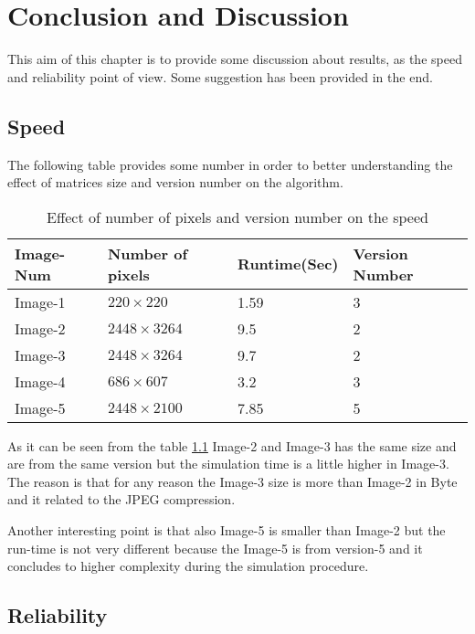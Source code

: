 \chapter{Conclusion and Discussion}

This aim of this chapter is to provide some discussion about results, as the speed and reliability point of view. Some suggestion has been provided in the end.

\section{Speed}

The following table provides some number in order to better understanding the effect of matrices size and version number on the algorithm.

\begin{table}[h!]
  \centering
          \caption{Effect of number of pixels and version number on the speed}
         \label{table5.1}
    \begin{tabular}{| l | l | l | l |}
    \hline
    Image-Num & Number of pixels & Runtime(Sec) & Version Number \\ \hline
    Image-1 & $220\times220$ & 1.59 & 3  \\ \hline
    Image-2 & $2448\times3264$ & 9.5 & 2  \\ \hline
    Image-3 & $2448\times3264$ & 9.7 & 2  \\ \hline
    Image-4 & $686\times607$ & 3.2 & 3  \\ \hline
    Image-5 & $2448\times2100$ & 7.85 & 5  \\ \hline
    \end{tabular}

\end{table}

As it can be seen from the table \ref{table5.1} Image-2 and Image-3 has the same size and are from the same version but the simulation time is a little higher in Image-3. The reason is that for any reason the Image-3 size is more than Image-2 in Byte and it related to the JPEG compression.

Another interesting point is that also Image-5 is smaller than Image-2 but the run-time is not very different because the Image-5 is from version-5 and it concludes to higher complexity during the simulation procedure.

\section{Reliability}

